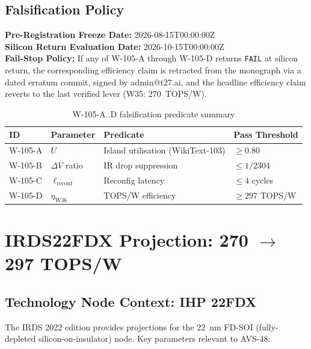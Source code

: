 \subsection{Falsification Policy}

\textbf{Pre-Registration Freeze Date:} 2026-08-15T00:00:00Z \\
\textbf{Silicon Return Evaluation Date:} 2026-10-15T00:00:00Z \\
\textbf{Fail-Stop Policy:} If any of W-105-A through W-105-D returns
\texttt{FAIL} at silicon return, the corresponding efficiency claim is
retracted from the monograph via a dated erratum commit, signed by
admin@t27.ai, and the headline efficiency claim reverts to the last
verified lever (W35: 270~TOPS/W).

\begin{table}[ht]
\centering
\caption{W-105-A..D falsification predicate summary}
\label{tab:w105_predicates}
\begin{tabular}{llp{5cm}l}
\hline
ID & Parameter & Predicate & Pass Threshold \\
\hline
W-105-A & $U$ & Island utilisation (WikiText-103) & $\geq 0.80$ \\
W-105-B & $\Delta V$ ratio & IR drop suppression & $\leq 1/2304$ \\
W-105-C & $\ell_\mathrm{reconf}$ & Reconfig latency & $\leq 4$ cycles \\
W-105-D & $\eta_\mathrm{W36}$ & TOPS/W efficiency & $\geq 297$ TOPS/W \\
\hline
\end{tabular}
\end{table}

\section{IRDS22FDX Projection: 270 $\to$ 297 TOPS/W}
\label{sec:irds_projection}

\subsection{Technology Node Context: IHP 22FDX}

The IRDS 2022 edition \cite{irds2023} provides projections for the
22~nm FD-SOI (fully-depleted silicon-on-insulator) node.  Key parameters
relevant to AVS-48:

